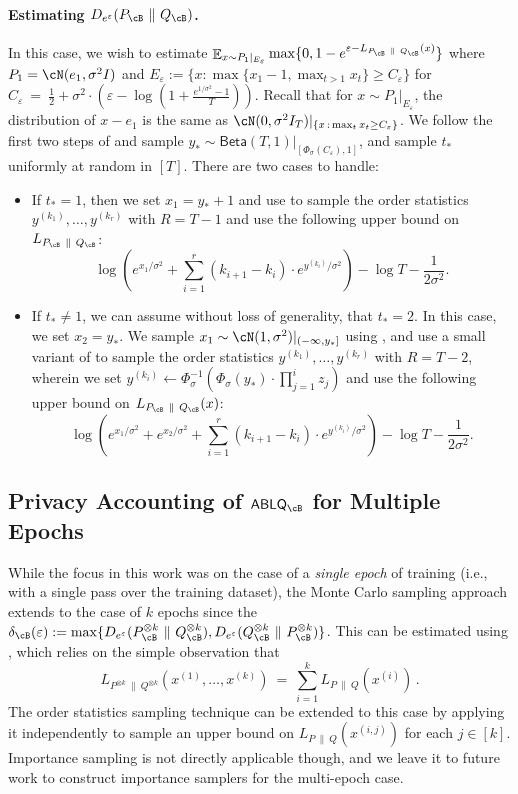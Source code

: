 \documentclass[twoside]{article}
\theoremstyle{definition}
\DeclareMathOperator*{\Ex}{\mathbb{E}}
\newcommand{\eps}{\varepsilon}
\newcommand{\prn}[1]{\left ( #1 \right )}
\newcommand{\Deps}{D_{e^{\eps}}}
\newcommand{\ABLQ}{\mathsf{ABLQ}}
\newcommand{\ABLQB}{\ABLQ_{\cB}}
\newcommand{\deltaB}{\delta_{\cB}}
\newcommand{\PB}{P_{\cB}}
\newcommand{\QB}{Q_{\cB}}
\newcommand{\Beta}{\mathsf{Beta}}
\begin{document}
\paragraph{\boldmath Estimating $\Deps(\PB ~\|~ \QB)$.} In this case, we wish to estimate $\Ex_{x \sim P_1 |_{E_\eps}} \max\{0, 1 - e^{\eps - L_{\PB ~\|~ \QB}(x)}\}$ where $P_1 = \cN(e_1, \sigma^2 I)$ and $E_\eps := \{ x : \max\{ x_1 - 1, \max_{t > 1} x_t\} \ge C_\eps \}$ for
$C_{\eps} ~=~ \frac{1}{2} + \sigma^2 \cdot \prn{\eps - \log\prn{1 + \frac{e^{1/\sigma^2} - 1}{T}}}$. Recall that for $x \sim P_1 |_{E_\eps}$, the distribution of $x - e_1$ is the same as $\cN(0, \sigma^2 I_T)|_{\{x\,:\,\max_t x_t \ge C_\eps\}}$.
We follow the first two steps of  and sample $y_* \sim \Beta(T, 1)|_{[\Phi_\sigma(C_\eps), 1]}$, and sample $t_*$ uniformly at random in $[T]$.
There are two cases to handle:
\begin{itemize}
\item If $t_* = 1$, then we set $x_1 = y_* + 1$ and use  to sample the order statistics $y^{(k_1)}, \ldots, y^{(k_r)}$ with $R = T-1$ and use the following upper bound on $L_{\PB ~\|~ \QB}$:
\[
\log\prn{e^{x_1/\sigma^2} + \sum_{i=1}^r (k_{i+1} - k_i) \cdot e^{y^{(k_i)}/\sigma^2}} - \log T - \frac{1}{2\sigma^2}.
\]
\item If $t_* \ne 1$, we can assume without loss of generality, that $t_* = 2$. In this case, we set $x_2 = y_*$. We sample $x_1 \sim \cN(1, \sigma^2)|_{(-\infty, y_*]}$ using , and use a small variant of  to sample the order statistics $y^{(k_1)}, \ldots, y^{(k_r)}$ with $R = T-2$, wherein we set $y^{(k_i)} \gets \Phi_\sigma^{-1}(\Phi_\sigma(y_*) \cdot \prod_{j=1}^i z_j)$ and use the following upper bound on $L_{\PB ~\|~ \QB}(x)$:
\[
\log\prn{e^{x_1/\sigma^2} + e^{x_2/\sigma^2} + \sum_{i=1}^r (k_{i+1} - k_i) \cdot e^{y^{(k_i)}/\sigma^2}} - \log T - \frac{1}{2\sigma^2}.
\]
\end{itemize}

\subsection{\boldmath Privacy Accounting of \texorpdfstring{$\ABLQB$}{ABLQ\_B} for Multiple Epochs}\label{subapp:multiple-epochs}

While the focus in this work was on the case of a {\em single epoch} of training (i.e., with a single pass over the training dataset), the Monte Carlo sampling approach extends to the case of $k$ epochs since the $\deltaB(\eps) := \max\{\Deps(\PB^{\otimes k} ~\|~ \QB^{\otimes k}), \Deps(\QB^{\otimes k} ~\|~ \PB^{\otimes k})\}$. This can be estimated using , which relies on the simple observation that
\[
L_{P^{\otimes k} ~\|~ Q^{\otimes k}}(x^{(1)}, \ldots, x^{(k)}) ~=~ \sum_{i=1}^k L_{P ~\|~ Q}(x^{(i)})\,.
\]
The order statistics sampling technique can be extended to this case by applying it independently to sample an upper bound on $L_{P ~\|~ Q}(x^{(i,j)})$ for each $j \in [k]$.  Importance sampling is not directly applicable though, and we leave it to future work to construct importance samplers for the multi-epoch case.
\end{document}
